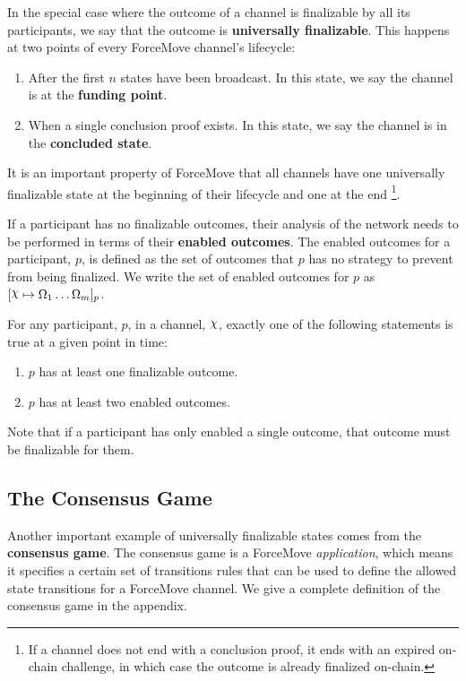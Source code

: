 \documentclass{article}
\begin{document}
In the special case where the outcome of a channel is finalizable by all its participants, we say that the outcome is \textbf{universally finalizable}.
This happens at two points of every ForceMove channel's lifecycle:
\begin{enumerate}
  \item After the first $n$ states have been broadcast. In this state, we say the channel is at the \textbf{funding point}.
  \item When a single conclusion proof exists. In this state, we say the channel is in the \textbf{concluded state}.
\end{enumerate}
It is an important property of ForceMove that all channels have one universally finalizable
state at the beginning of their lifecycle and one at the end
\footnote{If a channel does not end with a conclusion proof, it ends with an expired on-chain challenge,
in which case the outcome is already finalized on-chain.}.

If a participant has no finalizable outcomes, their analysis of the network needs to be performed
in terms of their \textbf{enabled outcomes}.
The enabled outcomes for a participant, $p$, is defined as the set of outcomes that $p$ has
no strategy to prevent from being finalized.
We write the set of enabled outcomes for $p$ as $\finalizable{\rchi}{\Omega_1 \dots \Omega_m}{p}$.

For any participant, $p$, in a channel, $\rchi$, exactly one of the following statements is
true at a given point in time:
\begin{enumerate}
  \item $p$ has at least one finalizable outcome.
  \item $p$ has at least two enabled outcomes.
\end{enumerate}
Note that if a participant has only enabled a single outcome, that outcome must be finalizable for them.

\subsection{The Consensus Game}

Another important example of universally finalizable states comes from the \textbf{consensus game}.
The consensus game is a ForceMove \textit{application}, which means it specifies a certain
set of transitions rules that can be used to define the allowed state transitions for a ForceMove
channel.
We give a complete definition of the consensus game in the appendix.
\end{document}
